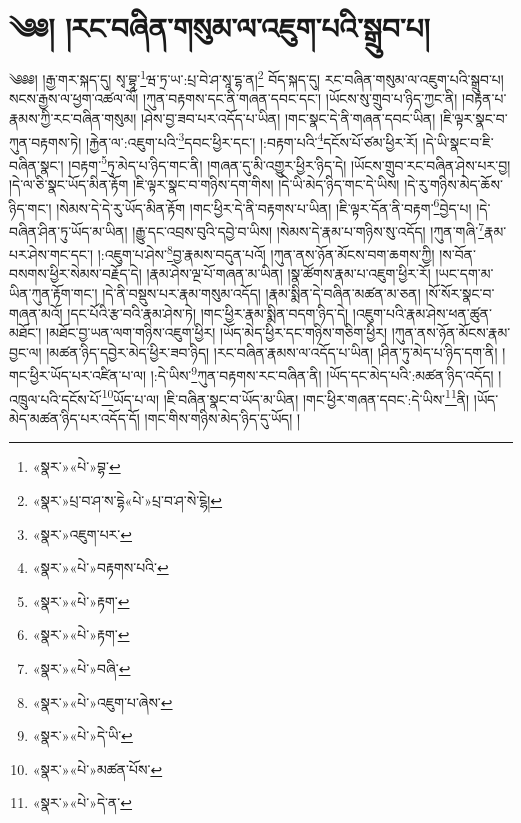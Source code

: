 \chapter{༄༅། །རང་བཞིན་གསུམ་ལ་འཇུག་པའི་སྒྲུབ་པ།}༄༅༅། །རྒྱ་གར་སྐད་དུ། སྭ་བྷཱ་\footnote{«སྣར་»«པེ་»བྷ་}ཝ་ཏྲ་ཡ་:པྲ་བེ་ཤ་སཱ་དྷ་ན།\footnote{«སྣར་»པྲ་བ་ཤ་ས་དྷེ«པེ་»པྲ་བ་ཤ་སེ་ངྷེ།} བོད་སྐད་དུ། རང་བཞིན་གསུམ་ལ་འཇུག་པའི་སྒྲུབ་པ། སངས་རྒྱས་ལ་ཕྱག་འཚལ་ལོ། །ཀུན་བརྟགས་དང་ནི་གཞན་དབང་དང་། །ཡོངས་སུ་གྲུབ་པ་ཉིད་ཀྱང་ནི། །བརྟན་པ་རྣམས་ཀྱི་རང་བཞིན་གསུམ། །ཤེས་བྱ་ཟབ་པར་འདོད་པ་ཡིན། །གང་སྣང་དེ་ནི་གཞན་དབང་ཡིན། །ཇི་ལྟར་སྣང་བ་ཀུན་བརྟགས་ཏེ། །རྐྱེན་ལ་:འཇུག་པའི་\footnote{«སྣར་»འཇུག་པར་}དབང་ཕྱིར་དང་། །:བརྟག་པའི་\footnote{«སྣར་»«པེ་»བརྟགས་པའི་}དངོས་པོ་ཙམ་ཕྱིར་རོ། །དེ་ཡི་སྣང་བ་ཇི་བཞིན་སྣང་། །བརྟག་\footnote{«སྣར་»«པེ་»རྟག་}ཏུ་མེད་པ་ཉིད་གང་ནི། །གཞན་དུ་མི་འགྱུར་ཕྱིར་ཉིད་དེ། །ཡོངས་གྲུབ་རང་བཞིན་ཤེས་པར་བྱ། །དེ་ལ་ཅི་སྣང་ཡོད་མིན་རྟོག །ཇི་ལྟར་སྣང་བ་གཉིས་དག་གིས། །དེ་ཡི་མེད་ཉིད་གང་དེ་ཡིས། །དེ་རུ་གཉིས་མེད་ཆོས་ཉིད་གང་། །སེམས་དེ་དེ་རུ་ཡོད་མིན་རྟོག །གང་ཕྱིར་དེ་ནི་བརྟགས་པ་ཡིན། །ཇི་ལྟར་དོན་ནི་བརྟག་\footnote{«སྣར་»«པེ་»རྟག་}བྱེད་པ། །དེ་བཞིན་ཤིན་ཏུ་ཡོད་མ་ཡིན། །རྒྱུ་དང་འབྲས་བུའི་དབྱེ་བ་ཡིས། །སེམས་དེ་རྣམ་པ་གཉིས་སུ་འདོད། །ཀུན་གཞི་\footnote{«སྣར་»«པེ་»བཞི་}རྣམ་པར་ཤེས་གང་དང་། །:འཇུག་པ་ཤེས་\footnote{«སྣར་»«པེ་»འཇུག་པ་ཞེས་}བྱ་རྣམས་བདུན་པའོ། །ཀུན་ནས་ཉོན་མོངས་བག་ཆགས་ཀྱི། །ས་བོན་བསགས་ཕྱིར་སེམས་བརྗོད་དེ། །རྣམ་ཤེས་ལྔ་པོ་གཞན་མ་ཡིན། །སྣ་ཚོགས་རྣམ་པ་འཇུག་ཕྱིར་རོ། །ཡང་དག་མ་ཡིན་ཀུན་རྟོག་གང་། །དེ་ནི་བསྡུས་པར་རྣམ་གསུམ་འདོད། །རྣམ་སྨིན་དེ་བཞིན་མཚན་མ་ཅན། །སོ་སོར་སྣང་བ་གཞན་མའོ། །དང་པོའི་རྩ་བའི་རྣམ་ཤེས་ཏེ། །གང་ཕྱིར་རྣམ་སྨིན་བདག་ཉིད་དེ། །འཇུག་པའི་རྣམ་ཤེས་ཕན་ཚུན་མཐོང་། །མཐོང་བྱ་ཡན་ལག་གཉིས་འཇུག་ཕྱིར། །ཡོད་མེད་ཕྱིར་དང་གཉིས་གཅིག་ཕྱིར། །ཀུན་ནས་ཉོན་མོངས་རྣམ་བྱང་ལ། །མཚན་ཉིད་དབྱེར་མེད་ཕྱིར་ཟབ་ཉིད། །རང་བཞིན་རྣམས་ལ་འདོད་པ་ཡིན། །ཤིན་ཏུ་མེད་པ་ཉིད་དག་ནི། །གང་ཕྱིར་ཡོད་པར་འཛིན་པ་ལ། །:དེ་ཡིས་\footnote{«སྣར་»«པེ་»དེ་ཡི་}ཀུན་བརྟགས་རང་བཞིན་ནི། །ཡོད་དང་མེད་པའི་:མཚན་ཉིད་འདོད། །འཁྲུལ་པའི་དངོས་པོ་\footnote{«སྣར་»«པེ་»མཚན་པོས་}ཡོད་པ་ལ། །ཇི་བཞིན་སྣང་བ་ཡོད་མ་ཡིན། །གང་ཕྱིར་གཞན་དབང་:དེ་ཡིས་\footnote{«སྣར་»«པེ་»དེ་ན་}ནི། །ཡོད་མེད་མཚན་ཉིད་པར་འདོད་དོ། །གང་གིས་གཉིས་མེད་ཉིད་དུ་ཡོད། །

